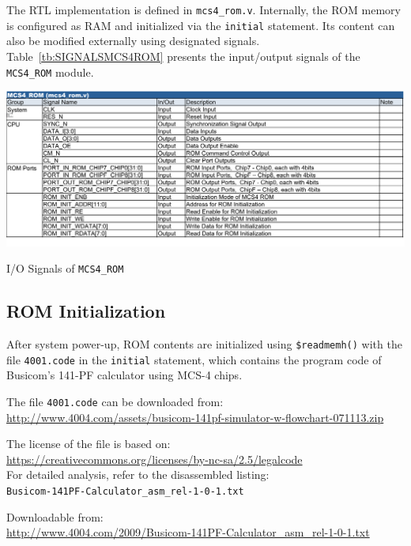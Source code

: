 The RTL implementation is defined in \texttt{mcs4\_rom.v}.  
Internally, the ROM memory is configured as RAM and initialized via the \verb|initial| statement.  
Its content can also be modified externally using designated signals.  
Table~\ref{tb:SIGNALSMCS4ROM} presents the input/output signals of the \texttt{MCS4\_ROM} module.

\begin{table}[htbp]
    \includegraphics[width=1.00\columnwidth]{./Table/SignalsMCS4ROM.png}
    \caption{I/O Signals of \texttt{MCS4\_ROM}}
    \label{tb:SIGNALSMCS4ROM}
\end{table}

\subsection{\textbf{ROM Initialization}}
After system power-up, ROM contents are initialized using \verb|$readmemh()| with the file \texttt{4001.code} in the \verb|initial| statement, which contains the program code of Busicom's 141-PF calculator using MCS-4 chips.  

The file \texttt{4001.code} can be downloaded from: \\
\url{http://www.4004.com/assets/busicom-141pf-simulator-w-flowchart-071113.zip}

The license of the file is based on: \\
\url{https://creativecommons.org/licenses/by-nc-sa/2.5/legalcode}
\\

For detailed analysis, refer to the disassembled listing: \\
\texttt{Busicom-141PF-Calculator\_asm\_rel-1-0-1.txt}  

Downloadable from: \\
\url{http://www.4004.com/2009/Busicom-141PF-Calculator_asm_rel-1-0-1.txt} 


